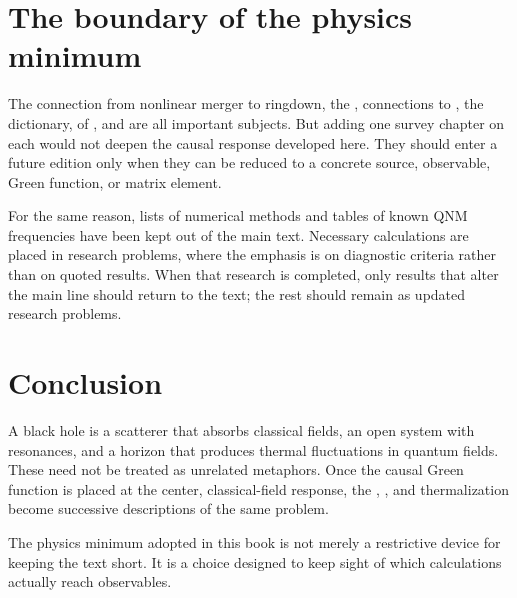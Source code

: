 \newpage
\section{The boundary of the physics minimum}

The connection from nonlinear merger to ringdown, the , connections to , the  dictionary,  of , and  are all important subjects. But adding one survey chapter on each would not deepen the causal response developed here. They should enter a future edition only when they can be reduced to a concrete source, observable, Green function, or matrix element.

For the same reason, lists of numerical methods and tables of known QNM frequencies have been kept out of the main text. Necessary calculations are placed in research problems, where the emphasis is on diagnostic criteria rather than on quoted results. When that research is completed, only results that alter the main line should return to the text; the rest should remain as updated research problems.

\section{Conclusion}

A black hole is a scatterer that absorbs classical fields, an open system with resonances, and a horizon that produces thermal fluctuations in quantum fields. These need not be treated as unrelated metaphors. Once the causal Green function is placed at the center, classical-field response, the , , and thermalization become successive descriptions of the same problem.

The physics minimum adopted in this book is not merely a restrictive device for keeping the text short. It is a choice designed to keep sight of which calculations actually reach observables.

